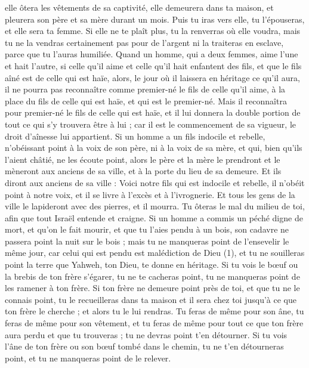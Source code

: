 \begin{multicols}{2}
elle ôtera les vêtements de sa captivité, elle demeurera dans ta maison, et pleurera son père et sa mère durant un mois. Puis tu iras vers elle, tu l’épouseras, et elle sera ta femme.
Si elle ne te plaît plus, tu la renverras où elle voudra, mais tu ne la vendras certainement pas pour de l'argent ni la traiteras en esclave, parce que tu l'auras humiliée.
Quand un homme, qui a deux femmes, aime l'une et hait l’autre, si celle qu’il aime et celle qu’il hait enfantent des fils, et que le fils aîné est de celle qui est haïe,
alors, le jour où il laissera en héritage ce qu’il aura, il ne pourra pas reconnaître comme premier-né le fils de celle qu’il aime, à la place du fils de celle qui est haïe, et qui est le premier-né.
Mais il reconnaîtra pour premier-né le fils de celle qui est haïe, et il lui donnera la double portion de tout ce qui s’y trouvera être à lui ; car il est le commencement de sa vigueur, le droit d'aînesse lui appartient.
Si un homme a un fils indocile et rebelle, n'obéissant point à la voix de son père, ni à la voix de sa mère, et qui, bien qu'ils l'aient châtié, ne les écoute point,
alors le père et la mère le prendront et le mèneront aux anciens de sa ville, et à la porte du lieu de sa demeure.
Et ils diront aux anciens de sa ville : Voici notre fils qui est indocile et rebelle, il n'obéit point à notre voix, et il se livre à l’excès et à l’ivrognerie.
Et tous les gens de la ville le lapideront avec des pierres, et il mourra. Tu ôteras le mal du milieu de toi, afin que tout Israël entende et craigne.
Si un homme a commis un péché digne de mort, et qu'on le fait mourir, et que tu l’aies pendu à un bois,
son cadavre ne passera point la nuit sur le bois ; mais tu ne manqueras point de l'ensevelir le même jour, car celui qui est pendu est malédiction de Dieu (1), et tu ne souilleras point la terre que Yahweh, ton Dieu, te donne en héritage.
\VerseOne{}Si tu vois le bœuf ou la brebis de ton frère s’égarer, tu ne te cacheras point, tu ne manqueras point de les ramener à ton frère.
Si ton frère ne demeure point près de toi, et que tu ne le connais point, tu le recueilleras dans ta maison et il sera chez toi jusqu'à ce que ton frère le cherche ; et alors tu le lui rendras.
Tu feras de même pour son âne, tu feras de même pour son vêtement, et tu feras de même pour tout ce que ton frère aura perdu et que tu trouveras ; tu ne devras point t’en détourner.
Si tu vois l'âne de ton frère ou son bœuf tombé dans le chemin, tu ne t’en détourneras point, et tu ne manqueras point de le relever.

\end{multicols}
